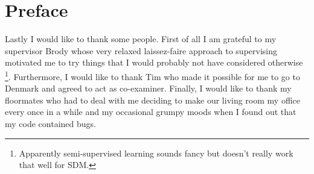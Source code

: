 \chapter{Preface}
\label{ch:Preface}
Lastly I would like to thank some people. First of all I am grateful to my supervisor Brody whose very relaxed laissez-faire approach to supervising motivated me to try things that I would probably not have considered otherwise \footnote{Apparently semi-supervised learning sounds fancy but doesn't really work that well for SDM.}. Furthermore, I would like to thank Tim who made it possible for me to go to Denmark and agreed to act as co-examiner. Finally, I would like to thank my floormates who had to deal with me deciding to make our living room my office every once in a while and my occasional grumpy moods when I found out that my code contained bugs.